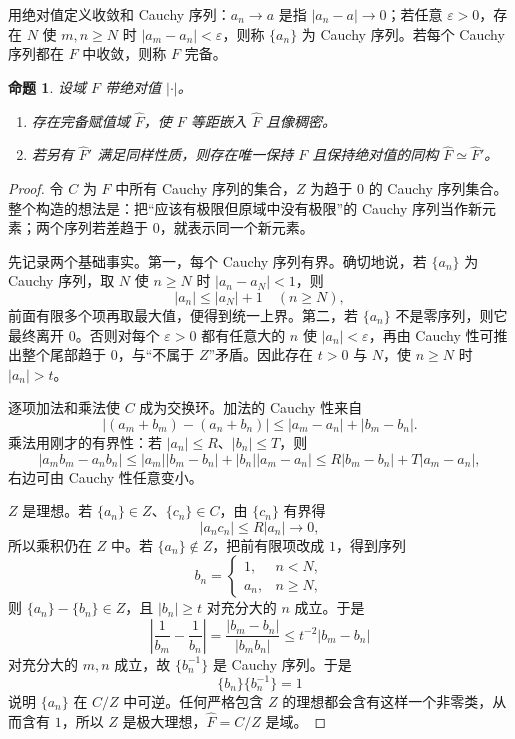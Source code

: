 \documentclass[11pt,a4paper,openany]{ctexbook}
\numberwithin{equation}{chapter}
\theoremstyle{plain}
\newtheorem{proposition}[theorem]{命题}
\theoremstyle{definition}
\theoremstyle{remark}
\begin{document}
用绝对值定义收敛和 Cauchy 序列：$a_n\to a$ 是指 $|a_n-a|\to0$；若任意 $\varepsilon>0$，存在 $N$ 使 $m,n\ge N$ 时 $|a_m-a_n|<\varepsilon$，则称 $\{a_n\}$ 为 Cauchy 序列。若每个 Cauchy 序列都在 $F$ 中收敛，则称 $F$ 完备。

\begin{proposition}
设域 $F$ 带绝对值 $|\cdot|$。
\begin{enumerate}[label=(\arabic*)]
\item 存在完备赋值域 $\widehat F$，使 $F$ 等距嵌入 $\widehat F$ 且像稠密。
\item 若另有 $\widehat F'$ 满足同样性质，则存在唯一保持 $F$ 且保持绝对值的同构 $\widehat F\simeq\widehat F'$。
\end{enumerate}
\end{proposition}

\begin{proof}
令 $C$ 为 $F$ 中所有 Cauchy 序列的集合，$Z$ 为趋于 $0$ 的 Cauchy 序列集合。整个构造的想法是：把“应该有极限但原域中没有极限”的 Cauchy 序列当作新元素；两个序列若差趋于 $0$，就表示同一个新元素。

先记录两个基础事实。第一，每个 Cauchy 序列有界。确切地说，若 $\{a_n\}$ 为 Cauchy 序列，取 $N$ 使 $n\ge N$ 时 $|a_n-a_N|<1$，则
\[
|a_n|\le |a_N|+1\quad(n\ge N),
\]
前面有限多个项再取最大值，便得到统一上界。第二，若 $\{a_n\}$ 不是零序列，则它最终离开 $0$。否则对每个 $\varepsilon>0$ 都有任意大的 $n$ 使 $|a_n|<\varepsilon$，再由 Cauchy 性可推出整个尾部趋于 $0$，与“不属于 $Z$”矛盾。因此存在 $t>0$ 与 $N$，使 $n\ge N$ 时 $|a_n|>t$。

逐项加法和乘法使 $C$ 成为交换环。加法的 Cauchy 性来自
\[
|(a_m+b_m)-(a_n+b_n)|
\le |a_m-a_n|+|b_m-b_n|.
\]
乘法用刚才的有界性：若 $|a_n|\le R$、$|b_n|\le T$，则
\[
|a_mb_m-a_nb_n|
\le |a_m||b_m-b_n|+|b_n||a_m-a_n|
\le R|b_m-b_n|+T|a_m-a_n|,
\]
右边可由 Cauchy 性任意变小。

$Z$ 是理想。若 $\{a_n\}\in Z$、$\{c_n\}\in C$，由 $\{c_n\}$ 有界得
\[
|a_nc_n|\le R|a_n|\to0,
\]
所以乘积仍在 $Z$ 中。若 $\{a_n\}\notin Z$，把前有限项改成 $1$，得到序列
\[
b_n=\begin{cases}
1,&n<N,\\
a_n,&n\ge N,
\end{cases}
\]
则 $\{a_n\}-\{b_n\}\in Z$，且 $|b_n|\ge t$ 对充分大的 $n$ 成立。于是
\[
\left|\frac1{b_m}-\frac1{b_n}\right|
=\frac{|b_m-b_n|}{|b_mb_n|}
\le t^{-2}|b_m-b_n|
\]
对充分大的 $m,n$ 成立，故 $\{b_n^{-1}\}$ 是 Cauchy 序列。于是
\[
\{b_n\}\{b_n^{-1}\}=1
\]
说明 $\{a_n\}$ 在 $C/Z$ 中可逆。任何严格包含 $Z$ 的理想都会含有这样一个非零类，从而含有 $1$，所以 $Z$ 是极大理想，$\widehat F=C/Z$ 是域。


\end{proof}
\end{document}
